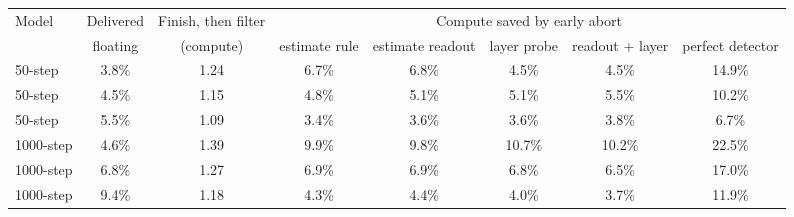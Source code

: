 \begin{tabular}{lccccccc}
\toprule
Model & Delivered & Finish, then filter & \multicolumn{5}{c}{Compute saved by early abort} \\
\cmidrule(lr){4-8} & floating & (compute) & estimate rule & estimate readout & layer probe & readout + layer & perfect detector \\
\midrule
50-step & 3.8\% & 1.24 & 6.7\% & 6.8\% & 4.5\% & 4.5\% & 14.9\% \\
50-step & 4.5\% & 1.15 & 4.8\% & 5.1\% & 5.1\% & 5.5\% & 10.2\% \\
50-step & 5.5\% & 1.09 & 3.4\% & 3.6\% & 3.6\% & 3.8\% & 6.7\% \\
1000-step & 4.6\% & 1.39 & 9.9\% & 9.8\% & 10.7\% & 10.2\% & 22.5\% \\
1000-step & 6.8\% & 1.27 & 6.9\% & 6.9\% & 6.8\% & 6.5\% & 17.0\% \\
1000-step & 9.4\% & 1.18 & 4.3\% & 4.4\% & 4.0\% & 3.7\% & 11.9\% \\
\bottomrule
\end{tabular}

